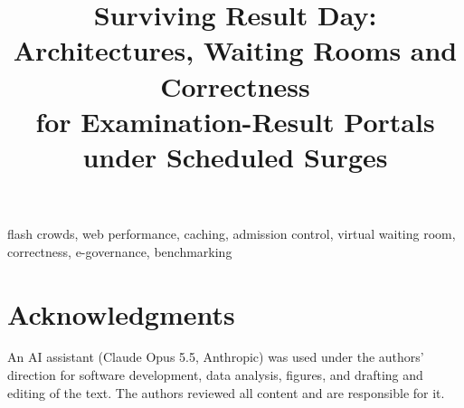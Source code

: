 \documentclass[conference]{IEEEtran}
\begin{document}
\title{Surviving Result Day: Architectures, Waiting Rooms and Correctness\\for Examination-Result Portals under Scheduled Surges}

\author{
\and
{}
}

\maketitle



\begin{IEEEkeywords}
flash crowds, web performance, caching, admission control, virtual waiting room, correctness, e-governance, benchmarking
\end{IEEEkeywords}









\section*{Acknowledgments}

An AI assistant (Claude Opus 5.5, Anthropic) was used under the authors'
direction for software development, data analysis, figures, and drafting and
editing of the text. The authors reviewed all content and are responsible for
it.



\end{document}
